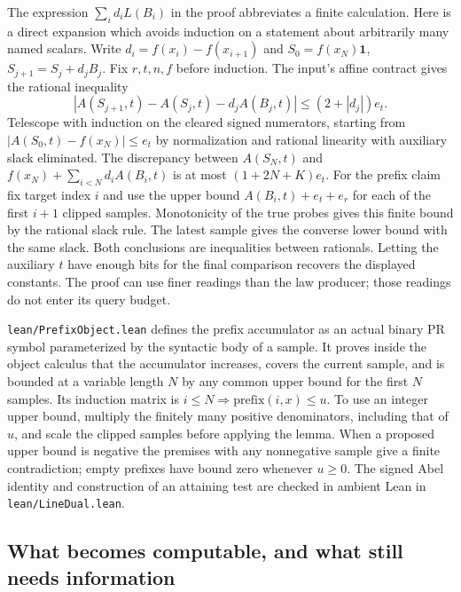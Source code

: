 The expression $\sum_i d_i L(B_i)$ in the proof abbreviates a finite
calculation. Here is a direct expansion which avoids induction on a statement
about arbitrarily many named scalars. Write $d_i=f(x_i)-f(x_{i+1})$ and
$S_0=f(x_N)\mathbf 1$, $S_{j+1}=S_j+d_j B_j$. Fix $r,t,n,f$ before
induction. The input's affine contract gives the rational inequality
\[
 |A(S_{j+1},t)-A(S_j,t)-d_jA(B_j,t)|\le(2+|d_j|)e_t.
\]
Telescope with induction on the cleared signed numerators, starting from
$|A(S_0,t)-f(x_N)|\le e_t$ by normalization and rational linearity with
auxiliary slack eliminated. The discrepancy between $A(S_N,t)$ and
$f(x_N)+\sum_{i<N}d_i A(B_i,t)$ is at most $(1+2N+K)e_t$.
For the prefix claim fix target index $i$ and use the upper bound
$A(B_i,t)+e_t+e_r$ for each of the first $i+1$ clipped samples.
Monotonicity of the true probes gives this finite bound by the rational
slack rule. The latest sample gives the converse lower bound with the same
slack. Both conclusions are inequalities between rationals. Letting the
auxiliary $t$ have enough bits for the final comparison recovers the displayed
constants. The proof can use finer readings than the law producer; those
readings do not enter its query budget.

\texttt{lean/PrefixObject.lean} defines the prefix accumulator as an actual
binary PR symbol parameterized by the syntactic body of a sample. It proves
inside the object calculus that the accumulator increases, covers the current
sample, and is bounded at a variable length $N$ by any common upper bound for
the first $N$ samples. Its induction matrix is
$i\le N\Rightarrow\mathrm{prefix}(i,x)\le u$. To use an integer upper bound,
multiply the finitely many positive denominators, including that of $u$, and
scale the clipped samples before applying the lemma. When a proposed upper
bound is negative the premises with any nonnegative sample give a finite
contradiction; empty prefixes have bound zero whenever $u\ge0$.
The signed Abel identity and construction of an attaining test are checked
in ambient Lean in \texttt{lean/LineDual.lean}.

\subsection{What becomes computable, and what still needs information}

